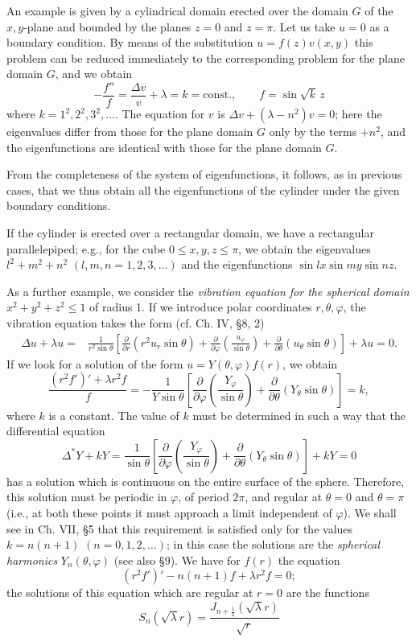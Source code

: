 An example is given by a cylindrical domain erected over the domain $G$ of the $x,y$-plane and bounded by the planes $z=0$ and $z=\pi$. Let us take $u=0$ as a boundary condition. By means of the substitution $u=f(z)v(x,y)$ this problem can be reduced immediately to the corresponding problem for the plane domain $G$, and we obtain
\[
-\frac{f''}{f}=\frac{\Delta v}{v}+\lambda=k=\mathrm{const.},
\qquad
f=\sin\sqrt{k}\,z
\]
where $k=1^2,2^2,3^2,\ldots$. The equation for $v$ is $\Delta v+(\lambda-n^2)v=0$; here the eigenvalues differ from those for the plane domain $G$ only by the terms $+n^2$, and the eigenfunctions are identical with those for the plane domain $G$.

From the completeness of the system of eigenfunctions, it follows, as in previous cases, that we thus obtain all the eigenfunctions of the cylinder under the given boundary conditions.

If the cylinder is erected over a rectangular domain, we have a rectangular parallelepiped; e.g., for the cube $0\le x,y,z\le\pi$, we obtain the eigenvalues $l^2+m^2+n^2$ $(l,m,n=1,2,3,\ldots)$ and the eigenfunctions $\sin lx\sin my\sin nz$.

As a further example, we consider the \emph{vibration equation for the spherical domain $x^2+y^2+z^2\le1$} of radius 1. If we introduce polar coordinates $r,\theta,\varphi$, the vibration equation takes the form (cf. Ch. IV, \S8, 2)
\[
\begin{aligned}
\Delta u+\lambda u
={}&\frac1{r^2\sin\theta}\left[
\frac{\partial}{\partial r}(r^2u_r\sin\theta)
+\frac{\partial}{\partial\varphi}\left(\frac{u_\varphi}{\sin\theta}\right)
+\frac{\partial}{\partial\theta}(u_\theta\sin\theta)
\right]+\lambda u=0.
\end{aligned}
\]
If we look for a solution of the form $u=Y(\theta,\varphi)f(r)$, we obtain
\[
\frac{(r^2f')'+\lambda r^2f}{f}
=-\frac1{Y\sin\theta}\left[
\frac{\partial}{\partial\varphi}\left(\frac{Y_\varphi}{\sin\theta}\right)
+\frac{\partial}{\partial\theta}(Y_\theta\sin\theta)
\right]=k,
\]
where $k$ is a constant. The value of $k$ must be determined in such a way that the differential equation
\[
\Delta^*Y+kY
=\frac1{\sin\theta}\left[
\frac{\partial}{\partial\varphi}\left(\frac{Y_\varphi}{\sin\theta}\right)
+\frac{\partial}{\partial\theta}(Y_\theta\sin\theta)
\right]+kY=0
\]
has a solution which is continuous on the entire surface of the sphere. Therefore, this solution must be periodic in $\varphi$, of period $2\pi$, and regular at $\theta=0$ and $\theta=\pi$ (i.e., at both these points it must approach a limit independent of $\varphi$). We shall see in Ch. VII, \S5 that this requirement is satisfied only for the values $k=n(n+1)$ $(n=0,1,2,\ldots)$; in this case the solutions are the \emph{spherical harmonics} $Y_n(\theta,\varphi)$ (see also \S9). We have for $f(r)$ the equation
\[
(r^2f')'-n(n+1)f+\lambda r^2f=0;
\]
the solutions of this equation which are regular at $r=0$ are the functions
\[
S_n(\sqrt\lambda r)=\frac{J_{n+\frac12}(\sqrt\lambda r)}{\sqrt r}
\]

